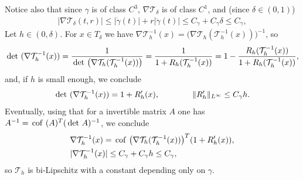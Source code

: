 \documentclass[a4paper,11pt]{article}
\numberwithin{equation}{section}
\def\cof{\,{\rm cof\ }}
\def\det{\,{\rm det\ }}
\begin{document}
Notice also that since $\gamma$ is of class $C^3$, $\nabla  \mathcal T_\delta$ is of class $C^1$,  and (since $\delta\in(0,1)$)
\begin{align*}
	|\nabla \mathcal T_\delta(t,r)|\leq |\dot\gamma(t)|+r|\ddot\gamma(t)|\leq C_\gamma+C_\gamma\delta\leq C_\gamma,
\end{align*}
Let $h\in (0,\delta)$. For $x\in T_\delta$ we have
$\nabla \mathcal T_h^{-1}(x)=\big(\nabla \mathcal T_h(\mathcal T_h^{-1}(x))\big)^{-1}$, so  $$\det(\nabla \mathcal T_h^{-1}(x))=\frac{1}{\det\big(\nabla \mathcal T_h(\mathcal T_h^{-1}(x))\big)}
=\frac{1}{1+R_h(\mathcal T_h^{-1}(x))}=1-\frac{R_h(\mathcal T_h^{-1}(x))}{1+R_h(\mathcal T_h^{-1}(x))},$$
and, if $h$ is small enough, we conclude 
\begin{align}\det(\nabla \mathcal T_h^{-1}(x))= 1+R'_h(x),\qquad \qquad \|R'_h\|_{L^\infty}\leq C_\gamma h.\label{detT-1}
\end{align}
Eventually, using that for a invertible matrix $A$ one has $A^{-1}=\cof(A)^T(\det A)^{-1}$, we conclude
\begin{align}
	&\nabla \mathcal T_h^{-1}(x)= \cof\big(\nabla \mathcal T_h(\mathcal T_h^{-1}(x))\big)^T(1+R'_h(x)),\nonumber\\
	&|\nabla \mathcal T_h^{-1}(x)|\leq C_\gamma+C_\gamma h\leq C_\gamma,
\end{align}
so $\mathcal T_h$ is bi-Lipschitz with a constant depending only on $\gamma$.
\medskip
\end{document}
